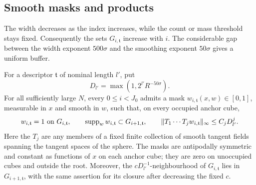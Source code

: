 \subsection{Smooth masks and products}

The width decreases as the index increases, while the count or mass
threshold stays fixed.  Consequently the sets $G_{i,\mathfrak t}$ increase with
$i$.  The considerable gap between the width exponent $500\sigma$
and the smoothing exponent $50\sigma$ gives a uniform buffer.

\begin{lemma}\label{test:smooth-masks}
For a descriptor $\mathfrak t$ of nominal length $l'$, put
\[
D_{l'}=\max(1,2^{l'}R^{-50\sigma}).
\]
For all sufficiently large $N$, every $0\le i<J_0$ admits a mask
$w_{i,\mathfrak t}(x,w)\in[0,1]$, measurable in $x$ and smooth in $w$, such
that, on every occupied anchor cube,
\begin{equation}\label{test:mask-properties}
w_{i,\mathfrak t}=1\text{ on }G_{i,\mathfrak t},\qquad
\operatorname{supp}_w w_{i,\mathfrak t}\subset G_{i+1,\mathfrak t},\qquad
\|T_1\cdots T_jw_{i,\mathfrak t}\|_\infty\le C_jD_{l'}^j.
\end{equation}
Here the $T_j$ are any members of a fixed finite collection of smooth
tangent fields spanning the tangent spaces of the sphere.  The masks
are antipodally symmetric and constant as functions of $x$ on each
anchor cube; they are zero on unoccupied cubes and outside the root.
Moreover, the
$cD_{l'}^{-1}$-neighbourhood of $G_{i,\mathfrak t}$ lies in $G_{i+1,\mathfrak t}$, with
the same assertion for its closure after decreasing the fixed $c$.
\end{lemma}

